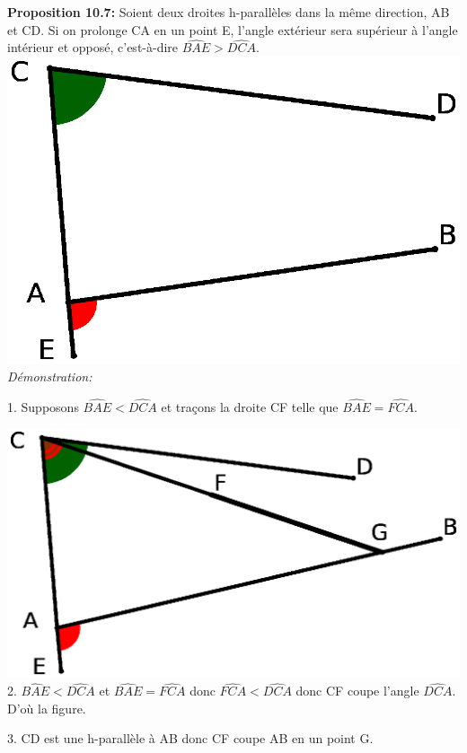\documentclass[a4paper, 12pt, twoside]{book}
\begin{document}
  
  \textbf{Proposition 10.7:} Soient deux droites h-parallèles dans la même direction, AB et CD. Si on prolonge CA en un point E, l'angle extérieur sera supérieur à l'angle intérieur et opposé, c'est-à-dire  $\hat{BAE}>\hat{DCA}$.\\
  
   
   \includegraphics[scale=0.4]{figures/Lobat12.eps}\\ 
   
   \textit{Démonstration:}\
   
   1. Supposons  $\hat{BAE}<\hat{DCA}$ et traçons la droite CF telle que  $\hat{BAE}=\hat{FCA}$.\
   
    \includegraphics[scale=0.4]{figures/Lobat13.eps}\\ 
   
   2. $\hat{BAE}<\hat{DCA}$ et   $\hat{BAE}=\hat{FCA}$ donc  $\hat{FCA}<\hat{DCA}$ donc CF coupe l'angle   $\hat{DCA}$. D'où la figure.\
   
   3. CD est une h-parallèle à AB donc CF coupe AB en un point G.\
   
\end{document}
